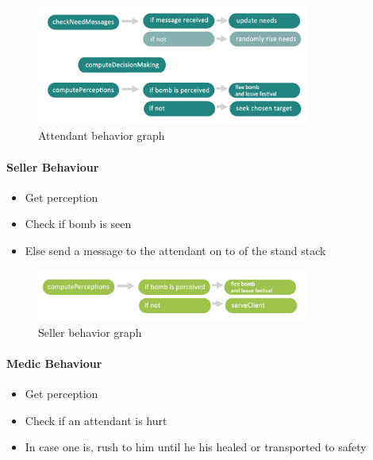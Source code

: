 \begin{figure}[h]
	\begin{center}
		\includegraphics[width=0.8\textwidth]{img/attendantbehaviour.png}
	\end{center}
	\caption{Attendant behavior graph}
\end{figure}

\paragraph{Seller Behaviour}

\begin{itemize}
	\item Get perception
	\item Check if bomb is seen
	\item Else send a message to the attendant on to of the stand stack
\end{itemize}

\begin{figure}[h]
	\begin{center}
		\includegraphics[width=0.8\textwidth]{img/sellerbehaviour.png}
	\end{center}
	\caption{Seller behavior graph}
\end{figure}

\paragraph{Medic Behaviour}

\begin{itemize}
	\item Get perception
	\item Check if an attendant is hurt
	\item In case one is, rush to him until he his healed or transported to safety
\end{itemize}


